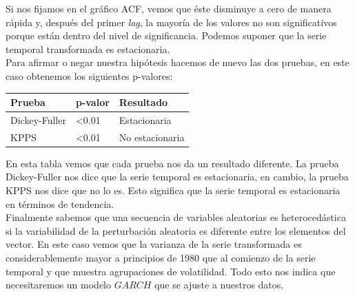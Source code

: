 \documentclass[a4paper,]{article}
\begin{document}
Si nos fijamos en el gráfico ACF, vemos que éste disminuye a cero de manera rápida y, después del primer \textit{lag}, la mayoría de los valores no son significativos porque están dentro del nivel de significancia. Podemos suponer que la serie temporal transformada es estacionaria.\\

Para afirmar o negar nuestra hipótesis hacemos de nuevo las dos pruebas, en este caso obtenemos los siguientes p-valores:
\begin{table}[H]
\centering
\begin{tabular}{|l|l|l|}
\hline
\rowcolor[HTML]{C0C0C0} 
{\color[HTML]{000000} Prueba}         & {\color[HTML]{000000} p-valor} & {\color[HTML]{000000} Resultado} \\ \hline
\cellcolor[HTML]{EFEFEF}Dickey-Fuller & \textless{}0.01                & Estacionaria                     \\ \hline
\cellcolor[HTML]{EFEFEF}KPPS          & \textless{}0.01                & No estacionaria                  \\ \hline
\end{tabular}
\end{table}
En esta tabla vemos que cada prueba nos da un resultado diferente. La prueba Dickey-Fuller nos dice que la serie temporal es estacionaria, en cambio, la prueba KPPS nos dice que no lo es. Esto significa que la serie temporal es estacionaria en términos de tendencia.\\

Finalmente sabemos que una secuencia de variables aleatorias es heterocedástica si la variabilidad de la perturbación aleatoria es diferente entre los elementos del vector. En este caso vemos que la varianza de la serie transformada es considerablemente mayor a principios de 1980 que al comienzo de la serie temporal y que muestra agrupaciones de volatilidad. Todo esto nos indica que necesitaremos un modelo $GARCH$ que se ajuste a nuestros datos. \\
\end{document}
